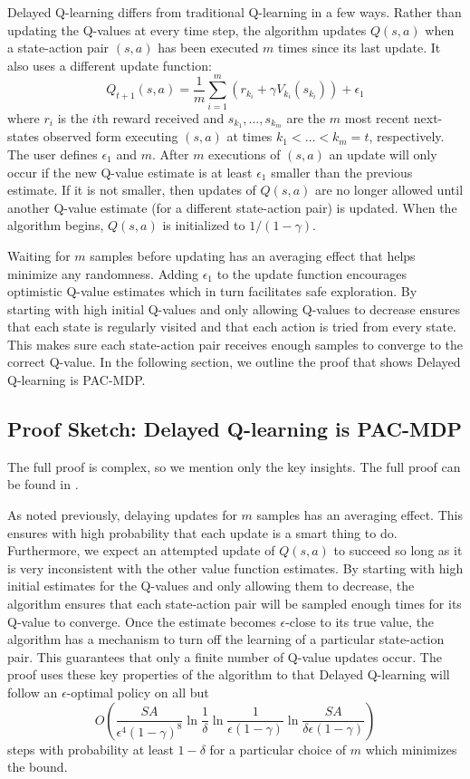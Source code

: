 \documentclass{article} %
\begin{document}
Delayed Q-learning differs from traditional Q-learning in a few ways.  Rather than updating the Q-values at every time step, the algorithm updates $Q(s,a)$ when a state-action pair $(s,a)$ has been executed $m$ times since its last update.  It also uses a different update function:
$$Q_{t+1}(s,a) = \frac{1}{m}\sum_{i=1}^m(r_{k_i}+\gamma V_{k_i}(s_{k_i})) + \epsilon_1$$  
where $r_i$ is the $i$th reward received and $s_{k_1},\dots,s_{k_m}$ are the $m$ most recent next-states observed form executing $(s,a)$ at times $k_1 < \dots < k_m = t$, respectively. The user defines $\epsilon_1$ and $m$.  After $m$ executions of $(s,a)$ an update will only occur if the new Q-value estimate is at least $\epsilon_1$ smaller than the previous estimate.  If it is not smaller, then updates of $Q(s,a)$ are no longer allowed until another Q-value estimate (for a different state-action pair) is updated.  When the algorithm begins, $Q(s,a)$ is initialized to $1/(1-\gamma)$.

Waiting for $m$ samples before updating has an averaging effect that helps minimize any randomness. Adding $\epsilon_1$ to the update function encourages optimistic Q-value estimates which in turn facilitates safe exploration. By starting with high initial Q-values and only allowing Q-values to decrease ensures that each state is regularly visited and that each action is tried from every state.  This makes sure each state-action pair receives enough samples to converge to the correct Q-value.  In the following section, we outline the proof that shows Delayed Q-learning is PAC-MDP.


\subsection{Proof Sketch: Delayed Q-learning is PAC-MDP}

The full proof is complex, so we mention only the key insights.  The full proof can be found in \cite{strehl_pac_2006}.  

As noted previously, delaying updates for $m$ samples has an averaging effect.  This ensures with high probability that each update is a smart thing to do.  Furthermore, we expect an attempted update of $Q(s,a)$ to succeed so long as it is very inconsistent with the other value function estimates.  By starting with high initial estimates for the Q-values and only allowing them to decrease, the algorithm ensures that each state-action pair will be sampled enough times for its Q-value to converge.  Once the estimate becomes $\epsilon$-close to its true value, the algorithm has a mechanism to turn off the learning of a particular state-action pair.  This guarantees that only a finite number of Q-value updates occur.  The proof uses these key properties of the algorithm to that Delayed Q-learning will follow an $\epsilon$-optimal policy on all but $$O\left(\frac{SA}{\epsilon^4(1-\gamma)^8}\ln{\frac{1}{\delta}}\ln{\frac{1}{\epsilon(1-\gamma)}}\ln{\frac{SA}{\delta\epsilon(1-\gamma)}}\right)$$ steps with probability at least $1-\delta$ for a particular choice of $m$ which minimizes the bound.
\end{document}
